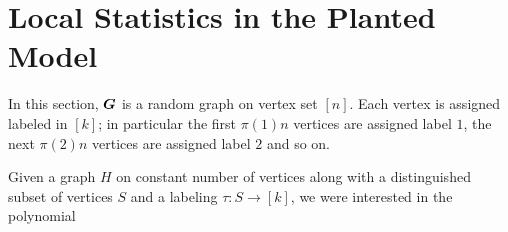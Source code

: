 \section{Local Statistics in the Planted Model}
In this section,  $\boldsymbol{G}$ is a random graph on vertex set $[n]$.  Each vertex is assigned labeled in $[k]$; in particular the first $\pi(1)n$ vertices are assigned label $1$, the next $\pi(2)n$ vertices are assigned label $2$ and so on.


Given a graph $H$ on constant number of vertices along with a distinguished subset of vertices $S$ and a labeling $\tau:S\to[k]$, we were interested in the polynomial 